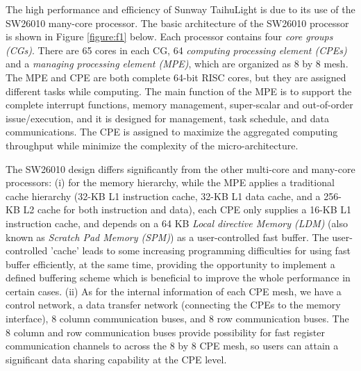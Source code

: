 The high performance and efficiency of Sunway TaihuLight is due to its use of the SW26010 many-core processor. The basic architecture of the SW26010 processor is shown in Figure \ref{figure:f1} below. Each processor contains four \emph{core groups (CGs)}. There are 65 cores in each CG, 64 \emph{computing processing element (CPEs)} and a \emph{managing processing element (MPE)}, which are organized as 8 by 8 mesh. The MPE and CPE are both complete 64-bit RISC cores, but they are assigned different tasks while computing. The main function of the MPE is to support the complete interrupt functions, memory management, super-scalar and out-of-order issue/execution, and it is designed for management, task schedule, and data communications. The CPE is assigned to maximize the aggregated computing throughput while minimize the complexity of the micro-architecture. 

The SW26010 design differs significantly from the other multi-core and many-core processors: (i) for the memory hierarchy, while the MPE applies a traditional cache hierarchy (32-KB L1 instruction cache, 32-KB L1 data cache, and a 256-KB L2 cache for both instruction and data), each CPE only supplies a 16-KB L1 instruction cache, and depends on a 64 KB \emph{Local directive Memory (LDM)} (also known as \emph{Scratch Pad Memory (SPM)}) as a user-controlled fast buffer. The user-controlled 'cache' leads to some increasing programming difficulties for using fast buffer efficiently, at the same time, providing the opportunity to implement a defined buffering scheme which is beneficial to improve the whole performance in certain cases. (ii) As for the internal information of each CPE mesh, we have a control network, a data transfer network (connecting the CPEs to the memory interface), 8 column communication buses, and 8 row communication buses. The 8 column and row communication buses provide possibility for fast register communication channels to across the 8 by 8 CPE mesh, so users can attain a significant data sharing capability at the CPE level. 

